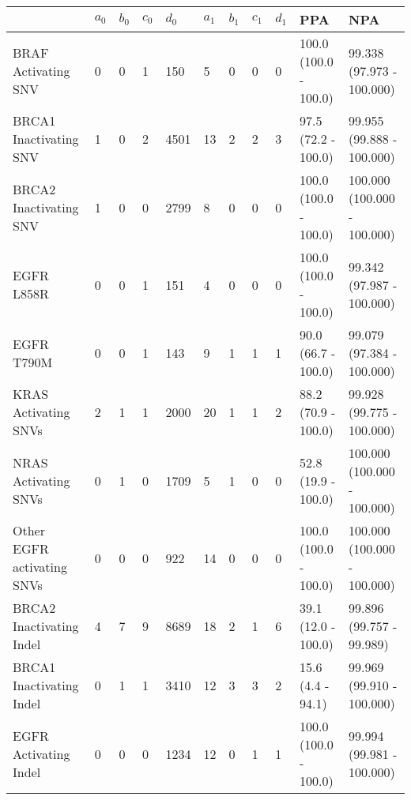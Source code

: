 \begin{tabular}{|l|l|l|l|l|l|l|l|l|l|l|}
\hline
\rowcolor[gray]{.85}{}                           & \textbf{$a_0$} & \textbf{$b_0$} & \textbf{$c_0$} & \textbf{$d_0$} & \textbf{$a_1$} & \textbf{$b_1$} & \textbf{$c_1$} & \textbf{$d_1$} & \textbf{PPA} & \textbf{                          NPA }\\ \hline
BRAF Activating SNV         &      0 &      0 &      1 &    150 &      5 &      0 &      0 &      0 &  100.0 (100.0 - 100.0) &    99.338 (97.973 - 100.000) \\ \hline
BRCA1 Inactivating SNV      &      1 &      0 &      2 &   4501 &     13 &      2 &      2 &      3 &    97.5 (72.2 - 100.0) &    99.955 (99.888 - 100.000) \\ \hline
BRCA2 Inactivating SNV      &      1 &      0 &      0 &   2799 &      8 &      0 &      0 &      0 &  100.0 (100.0 - 100.0) &  100.000 (100.000 - 100.000) \\ \hline
EGFR L858R                  &      0 &      0 &      1 &    151 &      4 &      0 &      0 &      0 &  100.0 (100.0 - 100.0) &    99.342 (97.987 - 100.000) \\ \hline
EGFR T790M                  &      0 &      0 &      1 &    143 &      9 &      1 &      1 &      1 &    90.0 (66.7 - 100.0) &    99.079 (97.384 - 100.000) \\ \hline
KRAS Activating SNVs        &      2 &      1 &      1 &   2000 &     20 &      1 &      1 &      2 &    88.2 (70.9 - 100.0) &    99.928 (99.775 - 100.000) \\ \hline
NRAS Activating SNVs        &      0 &      1 &      0 &   1709 &      5 &      1 &      0 &      0 &    52.8 (19.9 - 100.0) &  100.000 (100.000 - 100.000) \\ \hline
Other EGFR activating SNVs  &      0 &      0 &      0 &    922 &     14 &      0 &      0 &      0 &  100.0 (100.0 - 100.0) &  100.000 (100.000 - 100.000) \\ \hline
BRCA2 Inactivating Indel    &      4 &      7 &      9 &   8689 &     18 &      2 &      1 &      6 &    39.1 (12.0 - 100.0) &     99.896 (99.757 - 99.989) \\ \hline
BRCA1 Inactivating Indel    &      0 &      1 &      1 &   3410 &     12 &      3 &      3 &      2 &      15.6 (4.4 - 94.1) &    99.969 (99.910 - 100.000) \\ \hline
EGFR Activating Indel       &      0 &      0 &      0 &   1234 &     12 &      0 &      1 &      1 &  100.0 (100.0 - 100.0) &    99.994 (99.981 - 100.000) \\ \hline

\end{tabular}
